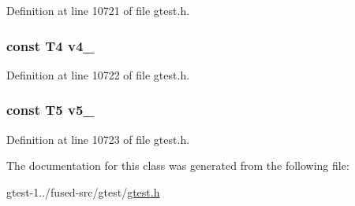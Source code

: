 \-Definition at line 10721 of file gtest.\-h.

\hypertarget{classtesting_1_1internal_1_1ValueArray5_aac184059fee257381ccae81d8d112f85}{
\subsubsection[{v4\-\_\-}]{\setlength{\rightskip}{0pt plus 5cm}const \-T4 {\bf v4\-\_\-}}}\label{d0/d2e/classtesting_1_1internal_1_1ValueArray5_aac184059fee257381ccae81d8d112f85}


\-Definition at line 10722 of file gtest.\-h.

\hypertarget{classtesting_1_1internal_1_1ValueArray5_a1f3e0ada8419ed2e17cc61e6c0c54404}{
\subsubsection[{v5\-\_\-}]{\setlength{\rightskip}{0pt plus 5cm}const \-T5 {\bf v5\-\_\-}}}\label{d0/d2e/classtesting_1_1internal_1_1ValueArray5_a1f3e0ada8419ed2e17cc61e6c0c54404}


\-Definition at line 10723 of file gtest.\-h.



\-The documentation for this class was generated from the following file\-:\begin{DoxyCompactItemize}
\item 
gtest-\/1../fused-\/src/gtest/\hyperlink{fused-src_2gtest_2gtest_8h}{gtest.\-h}\end{DoxyCompactItemize}

